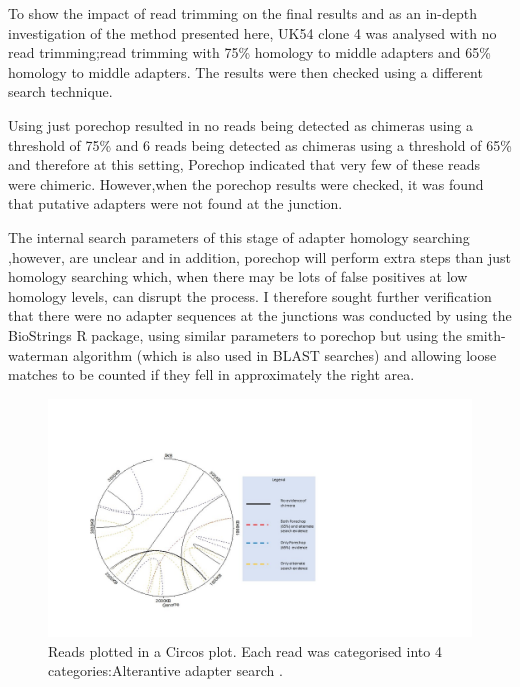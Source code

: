 To show the impact of read trimming on the final results and as an in-depth investigation of the method presented here, UK54 clone 4 was analysed with no read trimming;read trimming with 75\% homology to middle adapters and 65\% homology to middle adapters. The results were then checked using a different search technique.

Using just porechop resulted in no reads being detected as chimeras using a threshold of 75\% and 6 reads being detected as chimeras using a threshold of 65\% and therefore at this setting, Porechop indicated that very few of these reads were chimeric. However,when the porechop results were checked, it was found that putative adapters were not found at the junction.


The  internal search parameters of this stage of adapter homology searching ,however, are unclear and  in addition, porechop will perform extra steps than just homology searching which, when there may be lots of false positives at low homology levels, can disrupt the process. I therefore sought further verification that there were no adapter sequences at the junctions was conducted by using the BioStrings R package, using similar parameters to porechop but using the smith-waterman algorithm (which is also used in BLAST searches) and allowing loose matches to be counted if they fell in approximately the right area.

\begin{figure}[h!]
\centering
\includegraphics[width=\textwidth{}]{Chapter_2/baskey.jpg}
\caption{ Reads plotted in a Circos plot. Each read was categorised into 4 categories:Alterantive adapter search .}
\label{fig:Heatmap}
\end{figure}

